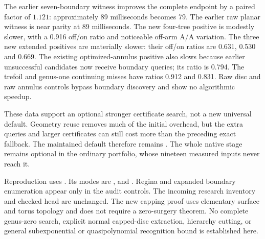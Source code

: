 The earlier seven-boundary witness improves the complete endpoint by a
paired factor of $1.121$: approximately 89 milliseconds becomes 79.
The earlier raw planar witness is near parity at 89 milliseconds.
The new four-tree positive is modestly slower, with a 0.916 off/on ratio
and noticeable off-arm A/A variation. The three new extended positives
are materially slower: their off/on ratios are 0.631, 0.530 and 0.669.
The existing optimized-annulus positive also slows because earlier
unsuccessful candidates now receive boundary queries; its ratio is 0.794.
The trefoil and genus-one continuing misses have ratios 0.912 and 0.831.
Raw disc and raw annulus controls bypass boundary discovery and show no
algorithmic speedup.

These data support an optional stronger certificate search, not a new
universal default. Geometry reuse removes much of the initial overhead,
but the extra queries and larger certificates can still cost more than
the preceding exact fallback. The maintained default therefore remains
. The whole native stage remains optional in the
ordinary portfolio, whose nineteen measured inputs never reach it.

Reproduction uses .
Its modes are ,  and
. Regina and expanded boundary enumeration
appear only in the audit controls. The incoming research inventory and
checked  head  are unchanged. The new
capping proof uses elementary surface and torus topology and does not
require a zero-surgery theorem. No complete genus-zero search, explicit
normal capped-disc extraction, hierarchy cutting, or general
subexponential or quasipolynomial recognition bound is established here.
